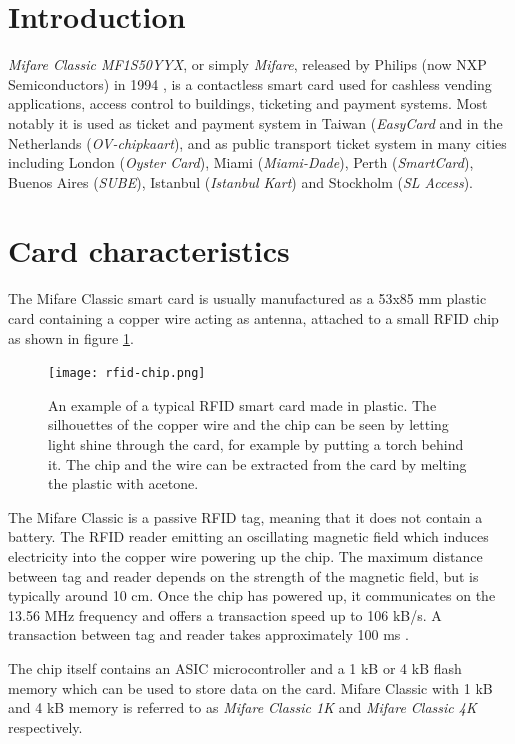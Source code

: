 \documentclass[10pt,twocolumn]{article}
\begin{document}
\section{Introduction}
\textit{Mifare Classic MF1S50YYX}, or simply \textit{Mifare}, released by Philips (now NXP Semiconductors) in 1994 \cite{cid10}, is a contactless smart card used for cashless vending applications, access control to buildings, ticketing and payment systems. Most notably it is used as ticket and payment system in Taiwan (\textit{EasyCard} and in the Netherlands (\textit{OV-chipkaart}), and as public transport ticket system in many cities including London (\textit{Oyster Card}), Miami (\textit{Miami-Dade}), Perth (\textit{SmartCard}), Buenos Aires (\textit{SUBE}), Istanbul (\textit{Istanbul Kart}) and Stockholm (\textit{SL Access}).

\section{Card characteristics}
The Mifare Classic smart card is usually manufactured as a 53x85 mm plastic card containing a copper wire acting as antenna, attached to a small RFID chip as shown in figure \ref{fig:rfid-chip}.

\begin{figure}[ht]
\texttt{[image: rfid-chip.png]}
\caption{An example of a typical RFID smart card made in plastic. The silhouettes of the copper wire and the chip can be seen by letting light shine through the card, for example by putting a torch behind it. The chip and the wire can be extracted from the card by melting the plastic with acetone.}
\label{fig:rfid-chip}
\end{figure}

The Mifare Classic is a passive RFID tag, meaning that it does not contain a battery. The RFID reader emitting an oscillating magnetic field which induces electricity into the copper wire powering up the chip. The maximum distance between tag and reader depends on the strength of the magnetic field, but is typically around 10 cm. Once the chip has powered up, it communicates on the 13.56 MHz frequency and offers a transaction speed up to 106 kB/s. A transaction between tag and reader takes approximately 100 ms \cite{mifare-sheet}.

The chip itself contains an ASIC microcontroller and a 1 kB or 4 kB flash memory which can be used to store data on the card. Mifare Classic with 1 kB and 4 kB memory is referred to as \textit{Mifare Classic 1K} and \textit{Mifare Classic 4K} respectively.
\end{document}
